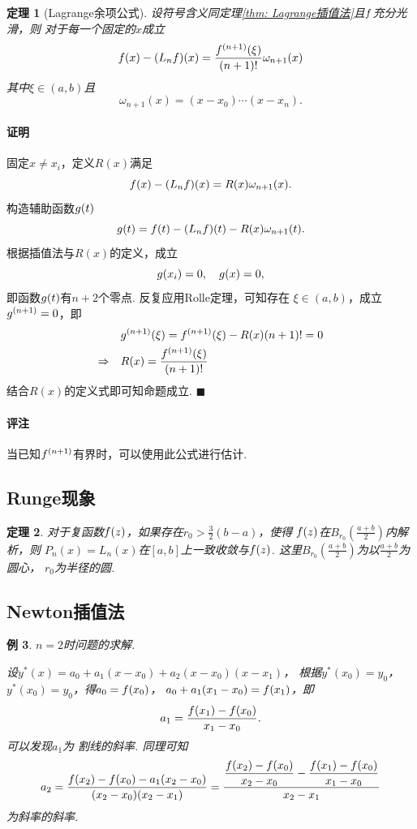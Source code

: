 \documentclass[12pt, a4paper]{article}
\theoremstyle{margin}
\newtheorem{thm}{定理}
\newtheorem{exa}[thm]{例}
\newcommand{\f}{\mathnormal{f}}
\newcommand{\g}{\mathnormal{g}}
\newcommand\thmref[1]{定理\ref{#1}}
\newcommand{\remark}{\paragraph{评注}}
\newcommand{\proof}{\paragraph{证明}}
\begin{document}
  \begin{thm}[Lagrange余项公式]
    设符号含义同\thmref{thm: Lagrange插值法}且$\f$充分光滑，则
    对于每一个固定的$x$成立
    \[
      \f(x) - (L_n\f)(x) =
      \frac{\f^{(n+1)}(\xi)}{(n+1)!}\omega_{n+1}(x)
    \]
    其中$\xi\in(a, b)$且
    \[
      \omega_{n+1}(x) = (x-x_0)\cdots(x-x_n).
    \]
  \end{thm}
  \proof
    固定$x\ne x_i$，定义$R(x)$满足
    \[
      \f(x) - (L_n\f)(x) = R(x)\omega_{n+1}(x).
    \]
    构造辅助函数$\g(t)$
    \[
      \g(t) = \f(t) - (L_n\f)(t) - R(x)\omega_{n+1}(t).
    \]
    根据插值法与$R(x)$的定义，成立
    \[
      \g(x_i) = 0,\quad g(x) = 0,
    \]
    即函数$\g(t)$有$n+2$个零点. 反复应用Rolle定理，可知存在
    $\xi\in(a, b)$，成立$\g^{(n+1)} = 0$，即
    \[\begin{split}
      & \g^{(n+1)}(\xi) = \f^{(n+1)}(\xi) - R(x)(n+1)! = 0 \\
      \Rightarrow\quad& R(x) = \frac{\f^{(n+1)}(\xi)}{(n+1)!}
    \end{split}\]
    结合$R(x)$的定义式即可知命题成立. $\blacksquare$
  \remark
    当已知$\f^{(n+1)}$有界时，可以使用此公式进行估计.

\subsection{Runge现象}
  \begin{thm}
    对于复函数$\f(z)$，如果存在$r_0>\frac32(b-a)$，使得
    $\f(z)$在$B_{r_0}(\frac{a+b}{2})$内解析，则
    $P_n(x) = L_n(x)$在$[a, b]$上一致收敛与$\f(z)$.
    这里$B_{r_0}(\frac{a+b}{2})$为以$\frac{a+b}{2}$为圆心，
    $r_0$为半径的圆.
  \end{thm}

\subsection{Newton插值法}
  \begin{exa}
    $n=2$时问题的求解. \par
    设$y^*(x) = a_0 + a_1(x-x_0) + a_2(x-x_0)(x-x_1)$，
    根据$y^*(x_0) = y_0$，$y^*(x_0) = y_0$，得$a_0 = \f(x_0)$，
    $a_0 + a_1(x_1-x_0) = \f(x_1)$，即
    \[
      a_1 = \frac{\f(x_1)-\f(x_0)}{x_1 - x_0}.
    \]
    可以发现$a_1$为
    割线的斜率. 同理可知
    \[
      a_2 = \frac{\f(x_2)-\f(x_0)-a_1(x_2-x_0)}{(x_2-x_0)(x_2-x_1)}
      = \frac{\dfrac{\f(x_2) - \f(x_0)}{x_2-x_0} - \dfrac{\f(x_1) - \f(x_0)}{x_1-x_0}}{x_2-x_1}
    \]
    为斜率的斜率.
  \end{exa}
\end{document}
